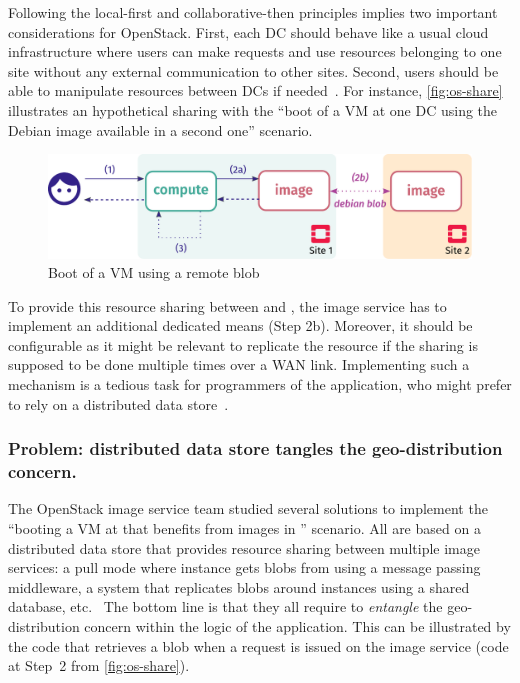 Following the local-first and collaborative-then principles implies
two important considerations for OpenStack.
%
First, each DC should behave like a usual cloud infrastructure where
users can make requests and use resources belonging to one site
without any external communication to other sites.
%
Second, users should be able to manipulate resources between DCs if
needed~\cite{CLPW+18}.
%
For instance, \autoref{fig:os-share} illustrates an hypothetical
sharing with the ``boot of a VM at one DC using the Debian image
available in a second one'' scenario.
%
\begin{figure}[h]
  \centering
  \includegraphics[width=.8\linewidth]{figs/pdf/openstack-share}
  \caption{Boot of a VM using a remote blob}
  \label{fig:os-share}
\end{figure}

To provide this resource sharing between \sOne and \sTwo, the image
service has to implement an additional dedicated means (Step 2b).
%
Moreover, it should be configurable as it might be relevant to
replicate the resource if the sharing is supposed to be done multiple
times over a WAN link.
%
Implementing such a mechanism is a tedious task for programmers of the
application, who might prefer to rely on a distributed data
store~\cite{CDEF+12}.


\subsubsection{Problem: distributed data store tangles the geo-distribution concern.}
\label{ssec:pb1}

The OpenStack image service team studied several solutions to
implement the ``booting a VM at \sOne that benefits from images in
\sTwo'' scenario.
%
All are based on a distributed data store that provides resource
sharing between multiple image services: a pull mode where \sOne
instance gets blobs from \sTwo using a message passing middleware, a
system that replicates blobs around instances using a shared database,
etc.~\cite{glance-edge}
%
The bottom line is that they all require to \emph{entangle} the
geo-distribution concern within the logic of the application.
%
This can be illustrated by the code that retrieves a blob when a
request is issued on the image service (code at Step~2 from
\autoref{fig:os-share}).



